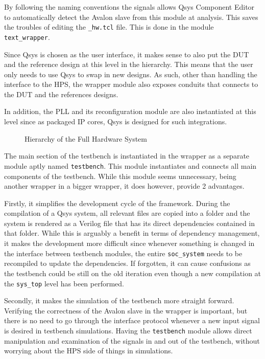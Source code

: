 By following the naming conventions  the signals allows Qsys Component Editor to automatically detect the Avalon slave from this module at analysis.
This saves the troubles of editing the \texttt{\_hw.tcl} file.
This is done in the module \texttt{text\_wrapper}.

Since Qsys is chosen as the user interface, it makes sense to also put the DUT and the reference design at this level in the hierarchy.
This means that the user only needs to use Qsys to swap in new designs.
As such, other than handling the interface to the HPS, the wrapper module also exposes conduits that connects to the DUT and the references designs.

In addition, the PLL and its reconfiguration module are also instantiated at this level since as packaged IP cores, Qsys is designed for such integrations.

\begin{figure}[H]
  \centering
  
  \caption{Hierarchy of the Full Hardware System}
  \label{Hierarchy}
\end{figure}

The main section of the testbench is instantiated in the wrapper as a separate module aptly named \texttt{testbench}.
This module instantiates and connects all main components of the testbench.
While this module seems unnecessary, being another wrapper in a bigger wrapper, it does however, provide 2 advantages.

Firstly, it simplifies the development cycle of the framework.
During the compilation of a Qsys system, all relevant files are copied into a folder and the system is rendered as a Verilog file that has its direct dependencies contained in that folder.
While this is arguably a benefit in terms of dependency management, it makes the development more difficult since whenever something is changed in the interface between testbench modules, the entire \texttt{soc\_system} needs to be recompiled to update the dependencies.
If forgotten, it can cause confusions as the testbench could be still on the old iteration even though a new compilation at the \texttt{sys\_top} level has been performed.

Secondly, it makes the simulation of the testbench more straight forward.
Verifying the correctness of the Avalon slave in the wrapper is important, but there is no need to go through the interface protocol whenever a new input signal is desired in testbench simulations.
Having the \texttt{testbench} module allows direct manipulation and examination of the signals in and out of the testbench, without worrying about the HPS side of things in simulations.


